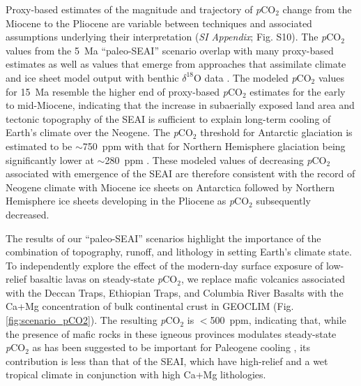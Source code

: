 \documentclass[9pt,twocolumn,twoside,lineno]{pnas-new}
\newcommand{\dO}{$\delta^{18}$O\xspace}
\newcommand{\pCOtwo}{\textit{p}CO$_{2}$\xspace}
\newcommand{\SI}{\textit{SI Appendix}\xspace}
\begin{document}
Proxy-based estimates of the magnitude and trajectory of \pCOtwo change from the Miocene to the Pliocene are variable between techniques and associated assumptions underlying their interpretation (\SI; Fig. S10). The \pCOtwo values from the 5~Ma ``paleo-SEAI'' scenario overlap with many proxy-based estimates \cite{Foster2017a} as well as values that emerge from approaches that assimilate climate and ice sheet model output with benthic \dO data \cite{van-de-Wal2011a, Berends2020a}. The modeled \pCOtwo values for 15~Ma resemble the higher end of proxy-based \pCOtwo estimates for the early to mid-Miocene, indicating that the increase in subaerially exposed land area and tectonic topography of the SEAI is sufficient to explain long-term cooling of Earth's climate over the Neogene. The \pCOtwo threshold for Antarctic glaciation is estimated to be $\sim$750~ppm with that for Northern Hemisphere glaciation being significantly lower at $\sim$280~ppm \cite{DeConto2008a}. These modeled values of decreasing \pCOtwo associated with emergence of the SEAI are therefore consistent with the record of Neogene climate with Miocene ice sheets on Antarctica \cite{Sugden1995a} followed by Northern Hemisphere ice sheets developing in the Pliocene \cite{Haug2005a} as \pCOtwo subsequently decreased.

The results of our ``paleo-SEAI'' scenarios highlight the importance of the combination of topography, runoff, and lithology in setting Earth's climate state. To independently explore the effect of the modern-day surface exposure of low-relief basaltic lavas on steady-state \pCOtwo \cite{Kent2013a}, we replace mafic volcanics associated with the Deccan Traps, Ethiopian Traps, and Columbia River Basalts with the Ca+Mg concentration of bulk continental crust in GEOCLIM (Fig. \ref{fig:scenario_pCO2}). The resulting \pCOtwo is $<$500~ppm, indicating that, while the presence of mafic rocks in these igneous provinces modulates steady-state \pCOtwo as has been suggested to be important for Paleogene cooling \cite{Kent2013a}, its contribution is less than that of the SEAI, which have high-relief and a wet tropical climate in conjunction with high Ca+Mg lithologies.
\end{document}
